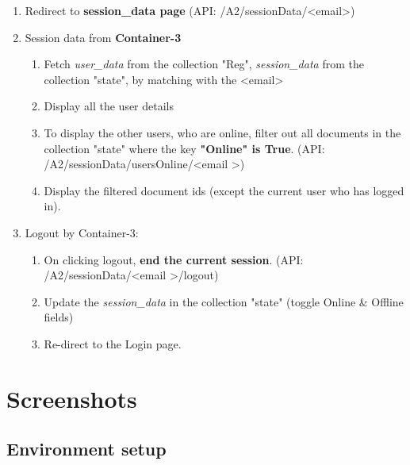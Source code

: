 \begin{enumerate}
\begin{enumerate}
\lstset{style=mystyle}

\begin{lstlisting}[language=Python]
{
    'Online': True,
    'Offline': False,
    'Timestamp': <current_system_time>
}
\end{lstlisting}
    \item Else, just update the fields (toggle Online \& Offline, update the current timestamp of system) 
    \end{enumerate}
    \item Redirect to \textbf{session\_data page} (API: /A2/sessionData/\textless email\textgreater)
    \item Session data from \textbf{Container-3}
    \begin{enumerate}
        \item Fetch \textit{user\_data} from the collection "Reg", \textit{session\_data} from the collection "state", by matching with the \textless email\textgreater
        \item Display all the user details
        \item To display the other users, who are online, filter out all documents in the collection "state" where the key \textbf{"Online" is True}. (API: /A2/sessionData/usersOnline/\textless email \textgreater)
        \item Display the filtered document ids (except the current user who has logged in).
    \end{enumerate}
    \item Logout by Container-3:
    \begin{enumerate}
        \item On clicking logout, \textbf{end the current session}. (API: /A2/sessionData/\textless email \textgreater/logout)
        \item Update the \textit{session\_data} in the collection "state" (toggle Online \& Offline fields)
        \item Re-direct to the Login page.
    \end{enumerate}


\end{enumerate}

\newpage
\chapter{Screenshots}
\section{Environment setup}

